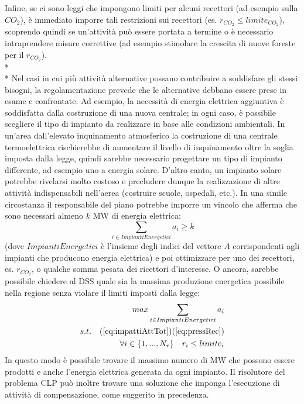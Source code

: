 Infine, se ci sono leggi che impongono limiti per alcuni recettori (ad esempio sulla $CO_2$), è immediato imporre tali restrizioni sui recettori (es. $r_{CO_2} \leq limite_{CO_2}$), scoprendo quindi se un'attività può essere portata a termine o è necessario intraprendere misure correttive (ad esempio stimolare la crescita di nuove foreste per il $r_{CO_2}$).
\\* \\*
Nel casi in cui più attività alternative possano contribuire a soddisfare gli stessi bisogni, la regolamentazione prevede che le alternative debbano essere prese in esame e confrontate. Ad esempio, la necessità di energia elettrica aggiuntiva è soddisfatta dalla costruzione di una nuova centrale; in ogni caso, è possibile scegliere il tipo di impianto da realizzare in base alle condizioni ambientali. In un'area dall'elevato inquinamento atmosferico la costruzione di una centrale termoelettrica rischierebbe di aumentare il livello di inquinamento oltre la soglia imposta dalla legge, quindi sarebbe necessario progettare un tipo di impianto differente, ad esempio uno a energia solare. D'altro canto, un impianto solare potrebbe rivelarsi molto costoso e precludere dunque la realizzazione di altre attività indispensabili nell'aerea (costruire scuole, ospedali, etc.). In una simile circostanza il responsabile del piano potrebbe imporre un vincolo che afferma che sono necessari almeno $k$ MW di energia elettrica:
\begin{equation}
\label{eq:kEner}
	\sum_{i \in ImpiantiEnergetici} a_i \geq k
\end{equation}
(dove $ImpiantiEnergetici$ è l'insieme degli indici del vettore $A$ corrispondenti agli impianti che producono energia elettrica) e poi ottimizzare per uno dei recettori, es. $r_{CO_2}$, o qualche somma pesata dei ricettori d'interesse. O ancora, sarebbe possibile chiedere al DSS quale sia la massima produzione energetica possibile nella regione senza violare il limiti imposti dalla legge:  
\begin{equation}
\label{eq:maxOutLimLaw}
	\begin{aligned}
		max \sum_{{i \in ImpiantiEnergetici}}  a_i\\
		s.t. \quad (\ref{eq:impattiAttTot}) (\ref{eq:pressRec}) \\
		\forall i \in \{ 1,...,N_r \} \quad r_i \leq limite_i
	\end{aligned}
\end{equation}
In questo modo è possibile trovare il massimo numero di MW che possono essere prodotti e anche l'energia elettrica generata da ogni impianto. Il risolutore del problema CLP può inoltre trovare una soluzione che imponga l'esecuzione di attività di compensazione, come suggerito in precedenza.

